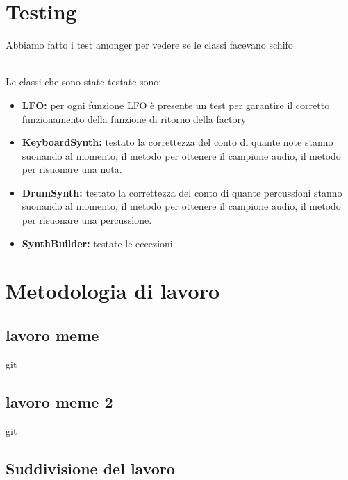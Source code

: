 \documentclass[a4paper,12pt]{report}
\begin{document}
\section{Testing}
Abbiamo fatto i test amonger per vedere se le classi facevano schifo \\ \\
{
Le classi che sono state testate sono: \\
\begin{itemize}
	\item \textbf{LFO:} per ogni funzione LFO è presente un test per garantire il corretto funzionamento della funzione di ritorno della factory
	
	\item \textbf{KeyboardSynth:} testato la correttezza del conto di quante note stanno suonando al momento, il metodo per ottenere il campione audio, il metodo per risuonare una nota.
	
	\item \textbf{DrumSynth:} testato la correttezza del conto di quante percussioni stanno suonando al momento, il metodo per ottenere il campione audio, il metodo per risuonare una percussione.
	
	\item \textbf{SynthBuilder:} testate le eccezioni
\end{itemize}
}
\newpage
\section{Metodologia di lavoro}
\subsection*{lavoro meme}
git 
\subsection*{lavoro meme 2}
git 
\newpage

\subsection*{Suddivisione del lavoro}
\end{document}
